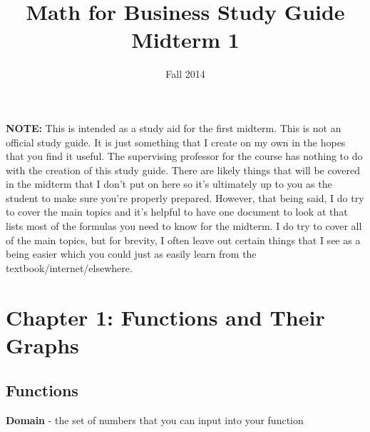 \documentclass[12pt]{article}
\begin{document}
\title{Math for Business Study Guide Midterm 1}
\date{Fall 2014}
\maketitle

\textbf{NOTE:} This is intended as a study aid for the first midterm. This is not an official study guide. It is just something that I create on my own in the hopes that you find it useful. The supervising professor for the course has nothing to do with the creation of this study guide. There are likely things that will be covered in the midterm that I don't put on here so it's ultimately up to you as the student to make sure you're properly prepared. However, that being said, I do try to cover the main topics and it's helpful to have one document to look at that lists most of the formulas you need to know for the midterm. I do try to cover all of the main topics, but for brevity, I often leave out certain things that I see as a being easier which you could just as easily learn from the textbook/internet/elsewhere. 



\section{Chapter 1: Functions and Their Graphs}

\subsection{Functions}

\textbf{Domain} - the set of numbers that you can input into your function
\end{document}
